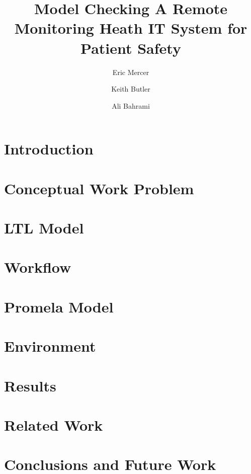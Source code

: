 \documentclass{llncs}
\begin{document}
\title{
  Model Checking A Remote Monitoring Heath IT System for Patient Safety
}

\author{
Eric Mercer
\and
Keith Butler 
\and
Ali Bahrami
}



\maketitle

\begin{abstract}

\end{abstract}

\section{Introduction}


\section{Conceptual Work Problem}


\section{LTL Model}


\section{Workflow}


\section{Promela Model}
\label{sec:bpmn}


\section{Environment}
\label{sec:env}


\section{Results}


\section{Related Work}


\section{Conclusions and Future Work}


\clearpage


\end{document}
